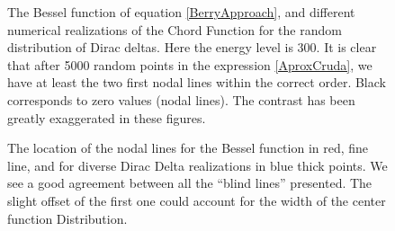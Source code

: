 \documentclass[a4paper,12pt]{article}
\begin{document}
\begin{figure}
\begin{center}
\caption{The Bessel function of equation \ref{BerryApproach},
and different numerical realizations of the
Chord Function for the random distribution of Dirac deltas.
Here the energy level is $300$. It is clear that  
after 5000 random points in the expression \ref{AproxCruda},
we have at least the two first nodal lines within the correct
order. Black corresponds to zero values (nodal lines). 
The contrast has been greatly exaggerated in these figures.}
\label{BesselCompare01}
\end{center}
\end{figure}


\begin{figure}
\begin{center}
\caption{The location of the nodal lines for the Bessel
function in red, fine line, and for diverse 
Dirac Delta realizations in blue thick points. We see a good
agreement between all the ``blind lines'' presented.
The slight offset of the first one could account for the
width of the center function Distribution.}
\label{BesselCompareZeros}
\end{center}
\end{figure}



\end{document}
